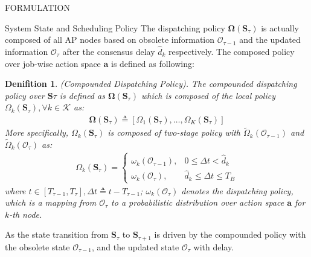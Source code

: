 \documentclass[10pt, conference, letterpaper]{IEEEtran}
\newtheorem{definition}{Denifition}
\newcommand{\define}{\triangleq}
\renewcommand{\vec}{\mathbf}
\newcommand{\apSet}{\mathcal{K}}
\newcommand{\Stat}{\mathbf{S}}
\newcommand{\Obsv}{\mathcal{O}}
\newcommand{\Policy}{\mathbf{\Omega}}
\begin{document}
\begin{section}{FORMULATION}
\begin{subsection}{System State and Scheduling Policy}
            The dispatching policy $\vec{\Omega}(\Stat_\tau)$ is actually composed of all AP nodes based on obsolete information $\Obsv_{\tau-1}$ and the updated information $\Obsv_{\tau}$ after the consensus delay $\hat{d}_k$ respectively. The composed policy over job-wise action space $\vec{a}$ is defined as following:
            \begin{definition}(Compounded Dispatching Policy).
                The compounded dispatching policy over $\Stat\tau$ is defined as $\Policy(\Stat_\tau)$ which is composed of the local policy $\Omega_k(\Stat_\tau), \forall k\in\apSet$ as:
                \begin{align}
                    \vec{\Omega}(\Stat_\tau) \triangleq [\Omega_1(\Stat_\tau), \dots, \Omega_K(\Stat_\tau)]
                \end{align}
                More specifically, $\Omega_k(\Stat_\tau)$ is composed of two-stage policy with $\tilde{\Omega}_k(\Obsv_{\tau-1})$ and $\tilde{\Omega}_k(\Obsv_{\tau})$ as:
                \begin{align}
                    \Omega_k(\Stat_\tau) = 
                    \begin{cases}
                        {\omega}_k(\Obsv_{\tau-1}), & 0 \leq \Delta{t} < \hat{d}_k
                        \\
                        {\omega}_k(\Obsv_{\tau}), & \hat{d}_k \leq \Delta{t} \leq T_B
                    \end{cases}
                \end{align}
                where $t\in[T_{\tau-1}, T_{\tau}] ,\Delta{t} \define t - T_{\tau-1}$; ${\omega}_k(\Obsv_\tau)$ denotes the dispatching policy, which is a mapping from $\Obsv_\tau$ to a probabilistic distribution over action space $\vec{a}$ for $k$-th node.
            \end{definition}

            As the state transition from $\Stat_{\tau}$ to $\Stat_{\tau+1}$ is driven by the compounded policy with the obsolete state $\Obsv_{\tau-1}$, and the updated state $\Obsv_{\tau}$ with delay.
        \end{subsection}


\end{section}
\end{document}
